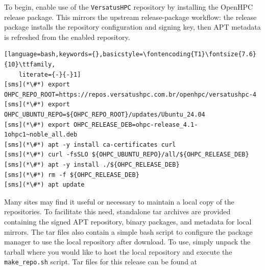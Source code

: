 To begin, enable use of the \texttt{VersatusHPC} \texttt{\baseOS{}}
repository by installing the OpenHPC release package. This mirrors the upstream release-package
workflow: the release package installs the repository configuration and signing
key, then APT metadata is refreshed from the enabled repository.

\begin{lstlisting}[language=bash,keywords={},basicstyle=\fontencoding{T1}\fontsize{7.6}{10}\ttfamily,
    literate={-}{-}1]
[sms](*\#*) export OHPC_REPO_ROOT=https://repos.versatushpc.com.br/openhpc/versatushpc-4
[sms](*\#*) export OHPC_UBUNTU_REPO=${OHPC_REPO_ROOT}/updates/Ubuntu_24.04
[sms](*\#*) export OHPC_RELEASE_DEB=ohpc-release_4.1-1ohpc1~noble_all.deb
[sms](*\#*) apt -y install ca-certificates curl
[sms](*\#*) curl -fsSLO ${OHPC_UBUNTU_REPO}/all/${OHPC_RELEASE_DEB}
[sms](*\#*) apt -y install ./${OHPC_RELEASE_DEB}
[sms](*\#*) rm -f ${OHPC_RELEASE_DEB}
[sms](*\#*) apt update
\end{lstlisting}

\begin{center}
\begin{tcolorbox}[]
\small Many sites may find it useful or necessary to maintain a local copy of the
\OHPC{} repositories. To facilitate this need, standalone tar archives are
provided containing the signed APT repository, binary packages, and metadata for
local mirrors. The tar files also contain a simple bash script to configure the
package manager to use the local repository after download. To use, simply
unpack the tarball where you would like to host the local repository and execute
the \texttt{make\_repo.sh} script. Tar files for this release can be found at
\href{https://repos.versatushpc.com.br/openhpc/versatushpc-4/update.4.1/Ubuntu_24.04/dist/4.1}
{\color{blue}{https://repos.versatushpc.com.br/openhpc/versatushpc-4/update.4.1/Ubuntu\_24.04/dist/4.1}}
\end{tcolorbox}
\end{center}
